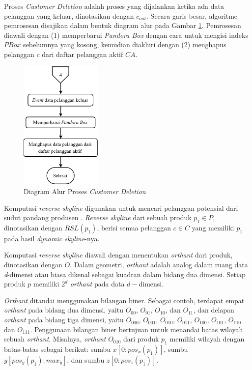 \pagebreak
{}

Proses \textit{Customer Deletion} adalah proses yang dijalankan ketika ada data pelanggan yang keluar, dinotasikan dengan $c_{out}$. Secara garis besar, algoritme pemrosesan disajikan dalam bentuk diagram alur pada Gambar \ref{fig:flowchart-co}. Pemrosesan diawali dengan (1) memperbarui \textit{Pandora Box} dengan cara untuk mengisi indeks $PBox$ sebelumnya yang kosong, kemudian diakhiri dengan (2) menghapus pelanggan $c$ dari daftar pelanggan aktif $CA$.  

\begin{figure}[H]
	\centering
	\includegraphics[width=4cm]{assets/img/bab3/flowchart-co.png}
	\caption{Diagram Alur Proses \textit{Customer Deletion}}
	\label{fig:flowchart-co}
\end{figure}



Komputasi \textit{reverse skyline} digunakan untuk mencari pelanggan potensial dari sudut pandang produsen \cite{kmpp}. \textit{Reverse skyline} \cite{reverse-skyline} dari sebuah produk $p_1 \in
P$, dinotasikan dengan $RSL(p_1)$, berisi semua pelanggan $c \in C$ yang memiliki $p_1$ pada hasil \textit{dynamic skyline}-nya.

\pagebreak
Komputasi \textit{reverse skyline} diawali dengan menentukan \textit{orthant} dari produk, dinotasikan dengan $O$. Dalam geometri, \textit{orthant} adalah analog dalam ruang data \textit{d}-dimensi atau biasa dikenal sebagai kuadran dalam bidang dua dimensi. Setiap produk $p$ memiliki $2^d$ \textit{orthant} pada data $d-$dimensi. 

\textit{Orthant} ditandai menggunakan bilangan biner. Sebagai contoh, terdapat empat \textit{orthant} pada bidang dua dimensi, yaitu $O_{00}$, $O_{01}$, $O_{10}$, dan $O_{11}$, dan delapan \textit{orthant} pada bidang tiga dimensi, yaitu $O_{000}$, $O_{001}$, $O_{010}$, $O_{011}$, $O_{100}$, $O_{101}$, $O_{110}$ dan $O_{111}$. Penggunaan bilangan biner bertujuan untuk menandai batas wilayah sebuah \textit{orthant}. Misalnya, \textit{orthant} $O_{010}$ dari produk $p_1$ memiliki wilayah dengan batas-batas sebagai berikut: sumbu $x [0:pos_x(p_1)]$, sumbu $y [pos_y(p_1):max_y]$, dan sumbu $z [0:pos_z(p_1)]$.

